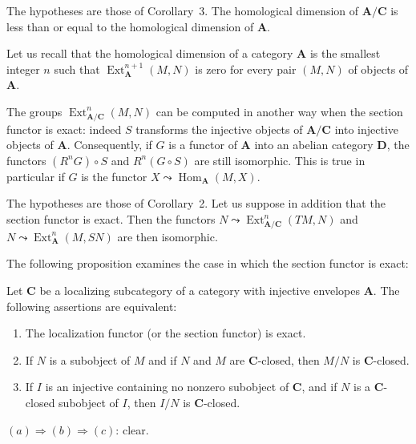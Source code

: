\begin{corollary}
The hypotheses are those of Corollary~3. The homological dimension of
$\mathbf{A}/\mathbf{C}$ is less than or equal to the homological dimension
of $\mathbf{A}$.
\end{corollary}

Let us recall that the homological dimension of a category $\mathbf{A}$ is
the smallest integer $n$ such that
$\operatorname{Ext}^{n+1}_{\mathbf{A}}(M,N)$ is zero for every pair
$(M,N)$ of objects of $\mathbf{A}$.

The groups $\operatorname{Ext}^{n}_{\mathbf{A}/\mathbf{C}}(M,N)$ can be
computed in another way when the section functor is exact: indeed $S$
transforms the injective objects of $\mathbf{A}/\mathbf{C}$ into injective
objects of $\mathbf{A}$. Consequently, if $G$ is a functor of $\mathbf{A}$
into an abelian category $\mathbf{D}$, the functors $(R^{n}G)\circ S$ and
$R^{n}(G\circ S)$ are still isomorphic. This is true in particular if $G$
is the functor $X\leadsto\operatorname{Hom}_{\mathbf{A}}(M,X)$.

\begin{corollary}
The hypotheses are those of Corollary~2. Let us suppose in addition that
the section functor is exact. Then the functors
$N\leadsto\operatorname{Ext}^{n}_{\mathbf{A}/\mathbf{C}}(TM,N)$ and
$N\leadsto\operatorname{Ext}^{n}_{\mathbf{A}}(M,SN)$ are then
isomorphic.
\end{corollary}

The following proposition examines the case in which the section functor
is exact:

\begin{proposition}
Let $\mathbf{C}$ be a localizing subcategory of a category with injective
envelopes $\mathbf{A}$. The following assertions are equivalent:
\begin{enumerate}
\item[a.] The localization functor (or the section functor) is exact.
\item[b.] If $N$ is a subobject of $M$ and if $N$ and $M$ are
      $\mathbf{C}$-closed, then $M/N$ is $\mathbf{C}$-closed.
\item[c.] If $I$ is an injective containing no nonzero subobject of
      $\mathbf{C}$, and if $N$ is a $\mathbf{C}$-closed subobject of $I$,
      then $I/N$ is $\mathbf{C}$-closed.
\end{enumerate}
\end{proposition}

$(a)\Rightarrow(b)\Rightarrow(c)$: clear.

